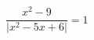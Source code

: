 \begin{ex}[type=equation]
	\begin{condition}
		$\dfrac{x^2 - 9}{\big | x^2 - 5x + 6\big|} = 1$
	\end{condition}
	\answer{$\varnothing$}
\end{ex}